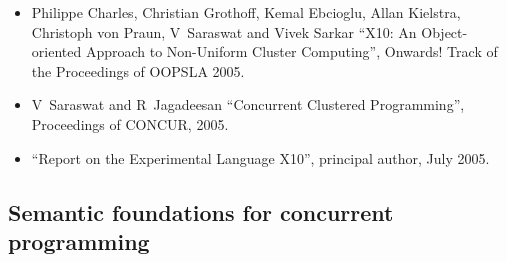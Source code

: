 \documentclass{article}
\begin{document}
\begin{itemize}
\item Philippe Charles, Christian Grothoff, Kemal Ebcioglu, Allan
  Kielstra, Christoph von Praun, V~Saraswat and Vivek Sarkar
  ``X10: An Object-oriented Approach to Non-Uniform Cluster
  Computing'', Onwards! Track of the Proceedings of OOPSLA 2005.

\item V~Saraswat and R~Jagadeesan ``Concurrent Clustered
  Programming'', Proceedings of CONCUR, 2005.

\item ``Report on the Experimental Language X10'', principal author,
July 2005.
\end{itemize}				   


\subsection*{Semantic foundations for concurrent programming}
\end{document}
